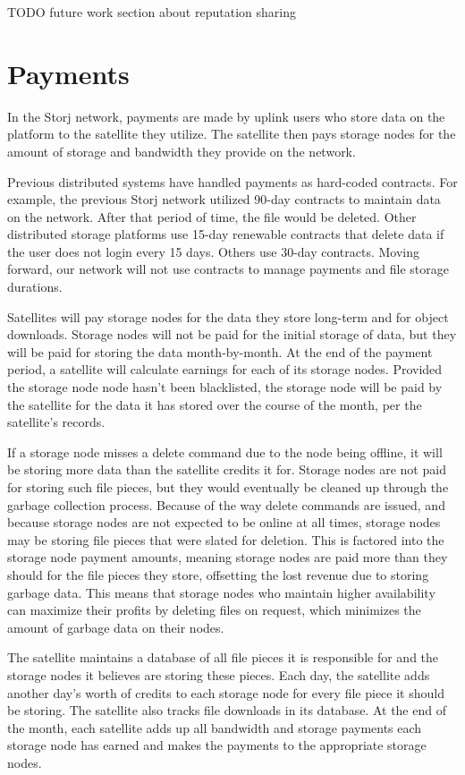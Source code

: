 \documentclass[11pt,fleqn,openany]{book}
\newcommand{\todo}[1]{{\color{red} TODO #1 }}
\begin{document}
\todo{future work section about reputation sharing}

\section{Payments}

In the Storj network, payments are made by uplink users who store data on the
platform to the satellite they utilize.
The satellite then pays storage nodes for the amount of storage and bandwidth
they
provide on the network.

Previous distributed systems have handled payments as hard-coded contracts.
For example, the previous Storj network utilized 90-day contracts to maintain
data on the network. After that period of time, the file would be deleted.
Other distributed storage platforms use 15-day renewable contracts that delete
data if the user does not login every 15 days. Others use 30-day contracts.
Moving forward, our network will not use contracts to manage payments and file
storage durations.

Satellites will pay storage nodes for the data they store long-term
and for object downloads.
Storage nodes will not be paid for the initial storage of data, but they
will be paid for storing the data month-by-month. At the end of the payment
period, a satellite will calculate earnings for each of its storage nodes.
Provided the storage node node hasn’t been blacklisted,
the storage node will be paid by the satellite for the data it has stored
over the course of
the month, per the satellite's records.

If a storage node misses a delete command due to the node being
offline, it will be storing more data than the satellite credits it for.
Storage nodes are not paid for storing such file pieces, but they
would eventually be cleaned up through the garbage collection process.
Because of the
way delete commands are issued, and because storage nodes are not expected to be
online at all times, storage nodes may be storing file pieces that were slated
for
deletion. This is factored into
the storage node payment amounts, meaning storage nodes are paid more than they
should for the file pieces they store, offsetting the lost revenue due to
storing garbage data.
This means that storage nodes who maintain higher availability
can maximize their profits by deleting files on request,
which minimizes the amount
of garbage data on their nodes.

The satellite maintains a database of all file pieces it is responsible for
and the storage nodes it believes are storing these pieces. Each day,
the satellite adds another day’s worth
of credits to each storage node for every file
piece
it should be storing. The satellite
also tracks file downloads in its database.
At the end of the month, each satellite
adds up all bandwidth and storage payments each storage node has earned and
makes
the payments to the appropriate storage nodes.
\end{document}
